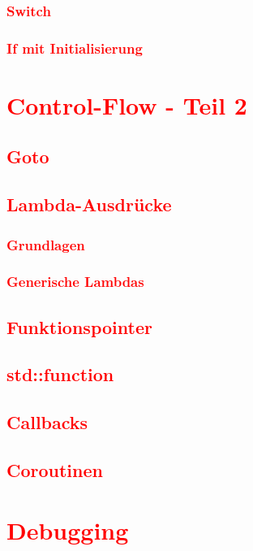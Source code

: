 \subsection{\textcolor{red}{Switch}}\label{sec:switch}
\subsection{\textcolor{red}{If mit Initialisierung}}\label{sec:if-with-initialization}

\cleardoublepage\chapter{\textcolor{red}{Control-Flow - Teil 2}}\label{chap:control-flow-2}
\section{\textcolor{red}{Goto}}\label{sec:goto}
\section{\textcolor{red}{Lambda-Ausdrücke}}\label{sec:lambda-expressions}
\subsection{\textcolor{red}{Grundlagen}}\label{sec:lambda-basics}
\subsection{\textcolor{red}{Generische Lambdas}}\label{sec:generic-lambdas}
\section{\textcolor{red}{Funktionspointer}}\label{sec:function-pointers}
\section{\textcolor{red}{std::function}}\label{sec:std-function}
\section{\textcolor{red}{Callbacks}}\label{sec:callbacks}
\section{\textcolor{red}{Coroutinen}}\label{sec:coroutines}

\cleardoublepage\chapter{\textcolor{red}{Debugging}}\label{chap:debugging}
